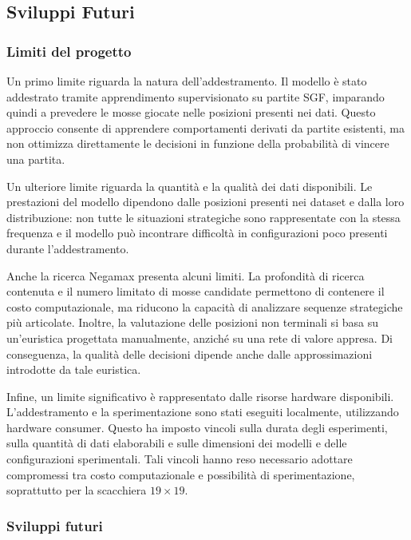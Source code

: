 \subsection{Sviluppi Futuri}

\subsubsection{Limiti del progetto}

Un primo limite riguarda la natura dell'addestramento. Il modello è stato addestrato tramite apprendimento supervisionato su partite SGF, imparando quindi a prevedere le mosse giocate nelle posizioni presenti nei dati. Questo approccio consente di apprendere comportamenti derivati da partite esistenti, ma non ottimizza direttamente le decisioni in funzione della probabilità di vincere una partita.

Un ulteriore limite riguarda la quantità e la qualità dei dati disponibili. Le prestazioni del modello dipendono dalle posizioni presenti nei dataset e dalla loro distribuzione: non tutte le situazioni strategiche sono rappresentate con la stessa frequenza e il modello può incontrare difficoltà in configurazioni poco presenti durante l'addestramento.

Anche la ricerca Negamax presenta alcuni limiti. La profondità di ricerca contenuta e il numero limitato di mosse candidate permettono di contenere il costo computazionale, ma riducono la capacità di analizzare sequenze strategiche più articolate. Inoltre, la valutazione delle posizioni non terminali si basa su un'euristica progettata manualmente, anziché su una rete di valore appresa. Di conseguenza, la qualità delle decisioni dipende anche dalle approssimazioni introdotte da tale euristica.

Infine, un limite significativo è rappresentato dalle risorse hardware disponibili. L'addestramento e la sperimentazione sono stati eseguiti localmente, utilizzando hardware consumer. Questo ha imposto vincoli sulla durata degli esperimenti, sulla quantità di dati elaborabili e sulle dimensioni dei modelli e delle configurazioni sperimentali. Tali vincoli hanno reso necessario adottare compromessi tra costo computazionale e possibilità di sperimentazione, soprattutto per la scacchiera $19 \times 19$.

\subsubsection{Sviluppi futuri}

